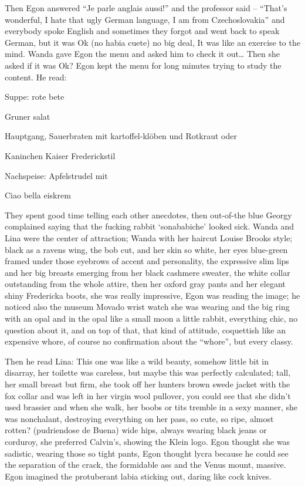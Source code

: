 \documentclass[smalldemyvopaper,11pt,twoside,onecolumn,openright,extrafontsizes]{memoir}
\begin{document}
Then Egon answered “Je parle anglais aussi!” and the professor said – “That’s wonderful, I hate that ugly German language, I am from Czechoslovakia” and everybody spoke English and sometimes they forgot and went back to speak German, but it was Ok (no habia cuete) no big deal, It was like an exercise to the mind. Wanda gave Egon the menu and asked him to check it out… Then she asked if it was Ok? Egon kept the menu for long minutes trying to study the content. He read:

Suppe: rote bete 

Gruner salat

Hauptgang, Sauerbraten mit kartoffel-klöben und Rotkraut oder

Kaninchen Kaiser Frederickstil

Nachspeise: Apfelstrudel mit

Ciao bella eiskrem 

They spent good time telling each other anecdotes, then out-of-the blue Georgy complained saying that the fucking rabbit ‘sonababiche’ looked sick. Wanda and Lina were the center of attraction; Wanda with her haircut Louise Brooks style; black as a ravens wing, the bob cut, and her skin so white, her eyes blue-green framed under those eyebrows of accent and personality, the expressive slim lips and her big breasts emerging from her black cashmere sweater, the white collar outstanding from the whole attire, then her oxford gray pants and her elegant shiny Fredericka boots, she was really impressive, Egon was reading the image; he noticed also the museum Movado wrist watch she was wearing and the big ring with an opal and in the opal like a small moon a little rabbit, everything chic, no question about it, and on top of that, that kind of attitude, coquettish like an expensive whore, of course no confirmation about the “whore”, but every classy.

Then he read Lina: This one was like a wild beauty, somehow little bit in disarray, her toilette was careless, but maybe this was perfectly calculated; tall, her small breast but firm, she took off her hunters brown swede jacket with the fox collar and was left in her virgin wool pullover, you could see that she didn’t used brassier and when she walk, her boobs or tits tremble in a sexy manner, she was nonchalant, destroying everything on her pass, so cute, so ripe, almost rotten? (pudriendose de Buena) wide hips, always wearing black jeans or corduroy, she preferred Calvin's, showing the Klein logo. Egon thought she was sadistic, wearing those so tight pants, Egon thought lycra because he could see the separation of the crack, the formidable ass and the Venus mount, massive. Egon imagined the protuberant labia sticking out, daring like cock knives.
\end{document}
